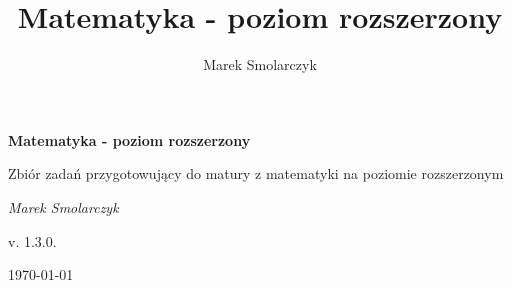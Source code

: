 \documentclass[a4paper,12pt]{book}
\begin{document}
\frontmatter

\begin{titlepage}
	\centering
	{ \bfseries \LARGE Matematyka - poziom rozszerzony \par }
	\vspace{1cm}
	{ \large Zbiór zadań przygotowujący do matury z matematyki na poziomie rozszerzonym \par }
	\vspace{3cm}
	{ \itshape \large Marek Smolarczyk \par }
	\vfill
	{ \large v. 1.3.0. \par }
	\vspace{0.2cm}
	{ \large \today \par }
\end{titlepage}

\author{Marek Smolarczyk}
\title{Matematyka - poziom rozszerzony}

\tableofcontents

\mainmatter


\backmatter
\end{document}
